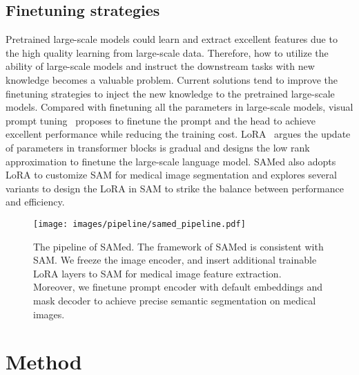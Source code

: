 \documentclass[runningheads]{llncs}
\begin{document}
\subsection{Finetuning strategies} Pretrained large-scale models could learn and extract excellent features due to the high quality learning from large-scale data. Therefore, how to utilize the ability of large-scale models and instruct the downstream tasks with new knowledge becomes a valuable problem. Current solutions tend to improve the finetuning strategies to inject the new knowledge to the pretrained large-scale models. Compared with finetuning all the parameters in large-scale models, visual prompt tuning~\cite{jia2022vpt} proposes to finetune the prompt and the head to achieve excellent performance while reducing the training cost. LoRA~\cite{hulora} argues the update of parameters in transformer blocks is gradual and designs the low rank approximation to finetune the large-scale language model. SAMed also adopts LoRA to customize SAM for medical image segmentation and explores several variants to design the LoRA in SAM to strike the balance between performance and efficiency.

\begin{figure*}[t]
\begin{center}
\texttt{[image: images/pipeline/samed\_pipeline.pdf]}
\end{center}
   \caption{The pipeline of SAMed. The framework of SAMed is consistent with SAM. We freeze the image encoder, and insert additional trainable LoRA layers to SAM for medical image feature extraction. Moreover, we finetune prompt encoder with default embeddings and mask decoder to achieve precise semantic segmentation on medical images.}
\label{fig:pipeline}
\end{figure*}

\section{Method}
\end{document}
